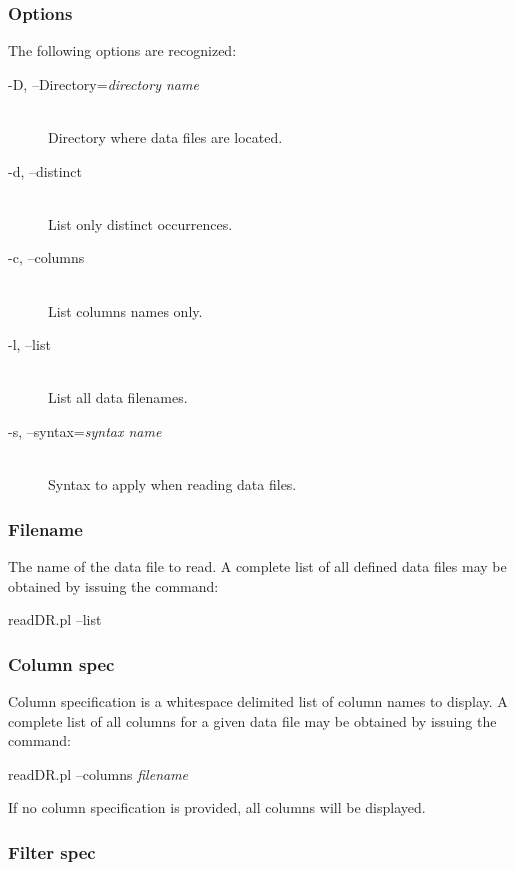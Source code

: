 \subsubsection*{Options}%

The following options are recognized:

\begin{description}

\item[-D, --Directory={\em directory name\/}]%
\hfil\\
Directory where data files are located.

\item[-d, --distinct]%
\hfil\\
List only distinct occurrences.

\item[-c, --columns]%
\hfil\\
List columns names only.

\item[-l, --list]%
\hfil\\
List all data filenames.

\item[-s, --syntax={\em syntax name\/}]%
\hfil\\
Syntax to apply when reading data files.

\end{description}

\subsubsection*{Filename}%

The name of the data file to read. A complete list of all defined data files may
be obtained by issuing the command:

readDR.pl --list

\subsubsection*{Column spec}%

Column specification is a whitespace delimited list of column names to display.
A complete list of all columns for a given data file may be obtained by issuing
the command:

readDR.pl --columns {\em filename\/}

If no column specification is provided, all columns will be displayed.

\subsubsection*{Filter spec}%

